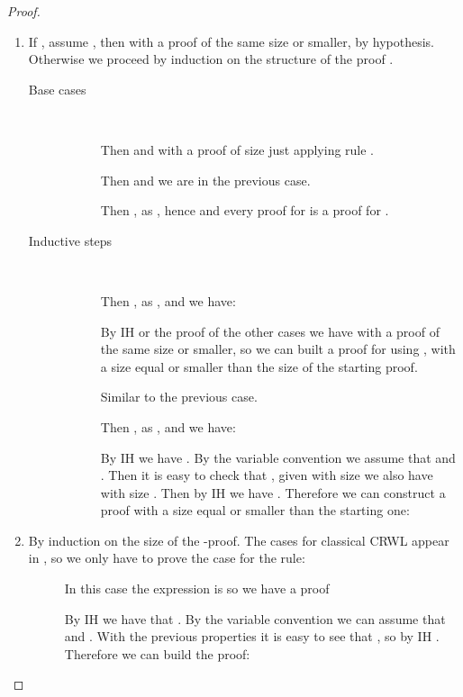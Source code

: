 \begin{proof}\label{DEMO_PropMonSubstCrwlLet}
\begin{enumerate}
\item If , assume , then  with a proof of the same size or smaller, by hypothesis. Otherwise we proceed by induction on the structure of the proof .
\begin{description}
 \item[Base cases]~
 \begin{description}
   \item[] Then  and  with a proof of size  just applying rule .
   \item[] Then  and we are in the previous case.
   \item[] Then , as , hence  and every proof for  is a proof for .
  \end{description}
 \item[Inductive steps]~
   \begin{description}
     \item[] Then , as , and we have:

By IH or the proof of the other cases  we have  with a proof of the same size or smaller, so we can built a proof for  using , with a size equal or smaller than the size of the starting proof.
   \item[]  Similar to the previous case.
\item[] Then , as , and we have:

    By IH we have . By the variable convention we assume that  and . Then it is easy to check that , given  with size  we also have  with size . Then by IH we have . Therefore we can construct a proof with a size equal or smaller than the starting one:
    
   \end{description}
 \end{description}

\item By induction on the size of the \crwll-proof. The cases for classical CRWL appear in \cite{vado02}, so we only have to prove the case for the  rule:
    \begin{description}
    \item[] In this case the expression is  so we have a proof
    
    By IH we have that . By the variable convention we can assume that  and . With the previous properties it is easy to see that , so by IH . Therefore we can build the proof:
    


\end{description}
\end{enumerate}
\end{proof}
